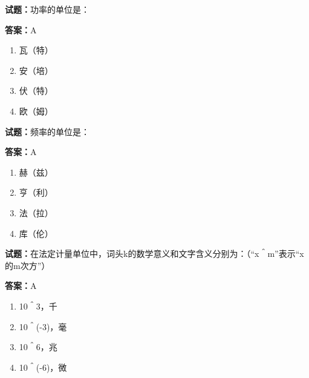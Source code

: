 \documentclass{ctexbook}
\begin{document}




\vspace{1em}

\textbf{试题：}功率的单位是： 

\textbf{答案：}A 

\begin{enumerate}[leftmargin=3em]
  \item 瓦（特） 

  \item 安（培） 

  \item 伏（特） 

  \item 欧（姆） 

\end{enumerate}





\vspace{1em}

\textbf{试题：}频率的单位是： 

\textbf{答案：}A 

\begin{enumerate}[leftmargin=3em]
  \item 赫（兹） 

  \item 亨（利） 

  \item 法（拉） 

  \item 库（伦） 

\end{enumerate}





\vspace{1em}

\textbf{试题：}在法定计量单位中，词头k的数学意义和文字含义分别为：（“x＾m”表示“x的m次方”） 

\textbf{答案：}A 

\begin{enumerate}[leftmargin=3em]
  \item 10＾3，千 

  \item 10＾(-3)，毫 

  \item 10＾6，兆 

  \item 10＾(-6)，微 

\end{enumerate}
\end{document}
